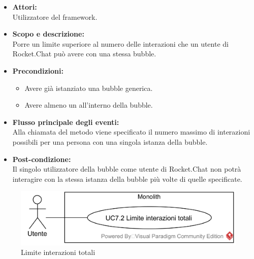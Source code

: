\begin{itemize}
	\item \textbf{Attori:}
	\\Utilizzatore del framework.
	\item \textbf{Scopo e descrizione:} 
	\\Porre un limite superiore al numero delle interazioni che un utente di Rocket.Chat può avere con una stessa bubble.
	\item \textbf{Precondizioni:}
	\begin{itemize}
		\item Avere già istanziato una bubble generica.
		\item Avere almeno un  all'interno della bubble.
	\end{itemize}
	\item \textbf{Flusso principale degli eventi:}
	\\Alla chiamata del metodo viene specificato il numero massimo di interazioni possibili per una persona con una singola istanza della bubble.
	\item \textbf{Post-condizione:}
	\\Il singolo utilizzatore della bubble come utente di Rocket.Chat non potrà interagire con la stessa istanza della bubble più volte di quelle specificate.
\end{itemize}

\begin{samepage}
\nopagebreak
\begin{figure}[H]
	\centering
	\includegraphics[width=15cm]{../../documenti/AnalisiDeiRequisiti/Diagrammi_img/usecase/uc1_09.png}
	\caption{\UCFCaption{} Limite interazioni totali}
\end{figure}
\end{samepage}


